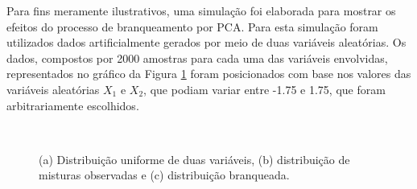
\pagebreak

Para fins meramente ilustrativos, uma simulação foi elaborada para mostrar os efeitos do processo de branqueamento por PCA. Para esta simulação foram utilizados dados artificialmente gerados por meio de duas variáveis aleatórias. Os dados, compostos por 2000 amostras para cada uma das variáveis envolvidas, representados no gráfico da Figura \ref{fig:bss_whitening_data_uniform} foram posicionados com base nos valores das variáveis aleatórias $X_{1}$ e $X_{2}$, que podiam variar entre -1.75 e 1.75, que foram arbitrariamente escolhidos.






\begin{figure}[H]
    \centering
    \\
    \caption{(a) Distribuição uniforme de duas variáveis, (b) distribuição de misturas observadas e (c) distribuição branqueada.}
    \label{fig:bss_whitening_data_uniform}
\end{figure}



